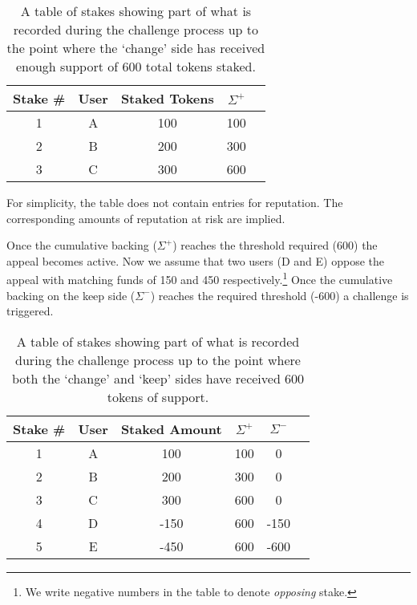 \begin{table}[ht]
\centering
\caption{A table of stakes showing part of what is recorded during the challenge process up to the point where the `change' side has received enough support of 600 total tokens staked.}
\begin{tabular}{|c|c|c|c|c|}
\hline
\textbf{Stake \#} & \textbf{User}  & \textbf{Staked Tokens} & \textbf{$\Sigma^+$} \\ \hline
1 & A & 100           & 100                                                                                          \\ \hline
2 & B & 200           & 300                                                                                           \\ \hline
3 & C & 300           & 600                                                                                           \\ \hline
\end{tabular}
\end{table}
For simplicity, the table does not contain entries for reputation. The corresponding amounts of reputation at risk are implied.

Once the cumulative backing ($\Sigma^+$) reaches the threshold required (600) the appeal becomes active. Now we assume that two users (D and E) oppose the appeal with matching funds of 150 and 450 respectively.\footnote{We write negative numbers in the table to denote \emph{opposing} stake.} Once the cumulative backing on the keep side ($\Sigma^-$) reaches the required threshold (-600) a challenge is triggered.

\begin{table}[ht]
\centering
\caption{A table of stakes showing part of what is recorded during the challenge process up to the point where both the `change' and `keep' sides have received 600 tokens of support.}
\begin{tabular}{|c|c|c|c|c|c|}
\hline
Stake \# & User  & Staked Amount & $\Sigma^+$ & $\Sigma^-$ \\ \hline
1 & A & 100           & 100                      & 0                                                                       \\ \hline
2 & B & 200           & 300                      & 0                                                                       \\ \hline
3 & C & 300           & 600                      & 0                                                                       \\ \hline
4 & D & -150          & 600                      & -150                                                                    \\ \hline
5 & E & -450          & 600                      & -600                                                                    \\ \hline
\end{tabular}
\end{table}

